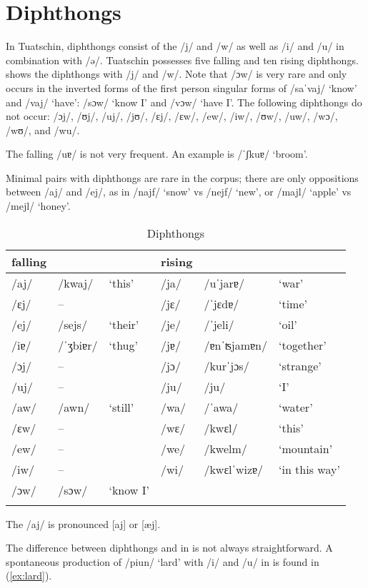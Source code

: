 \section{Diphthongs}\label{sec:2.2}
In Tuatschin, diphthongs consist of the  /j/ and /w/ as well as /i/ and /u/ in combination with /ə/. Tuatschin possesses five falling and ten rising diphthongs.  shows the diphthongs with /j/ and /w/. Note that /ɔw/ is very rare and only occurs in the inverted forms of the first person singular  forms of /saˈvaj/ `know' and /vaj/ `have': /sɔw/ `know I' and /vɔw/ `have I'. The following diphthongs do not occur: /ɔj/, /ʊj/, /uj/, /jʊ/, /ɛj/, /ɛw/, /ew/, /iw/, /ʊw/, /uw/, /wɔ/, /wʊ/, and /wu/.

The falling  /uɐ/ is not very frequent. An example is  /ˈʃkuɐ/ `broom'.

Minimal pairs with diphthongs are rare in the corpus; there are only oppositions between /aj/ and /ej/, as in /najf/ `snow' vs /nejf/ `new', or /majl/ `apple' vs /mejl/ `honey'.

\begin{table}
\caption{Diphthongs}
	\label{diph}
	\begin{tabular}{llllll}
		\lsptoprule
		falling & & & rising & & \\
		\midrule
		/aj/ & /kwaj/ & `this' & /ja/ & /uˈjarɐ/ & `war'\\
		/ɛj/ & -- & & /jɛ/ & /ˈjɛdɐ/ & `time'\\
		/ej/ & /sejs/ & `their' & /je/ & /ˈjeli/ & `oil'\\
		/iɐ/ & /ˈʒbiɐr/ & `thug' & /jɐ/ & /ɐnˈʦjamɐn/ & `together'\\
		/ɔj/ & -- & & /jɔ/ & /kurˈjɔs/ & `strange'\\
		/uj/ & -- & & /ju/ & /ju/ & `I'\\
		/aw/ & /awn/ & `still' & /wa/ & /ˈawa/ & `water'\\
		/ɛw/ & -- & & /wɛ/ & /kwɛl/ & `this'\\
		/ew/ &  -- & & /we/ & /kwelm/ & `mountain'\\
		/iw/ & -- & & /wi/ & /kwɛlˈwizɐ/ & `in this way'\\
		/ɔw/ & /sɔw/ & `know I' \\
		\lspbottomrule
	\end{tabular}
\end{table}

The  /aj/ is pronounced [aj] or [æj].

The difference between diphthongs and  in  is not always straightforward. A spontaneous production of /piun/ `lard' with /i/ and /u/ in  is found in (\ref{ex:lard}).

